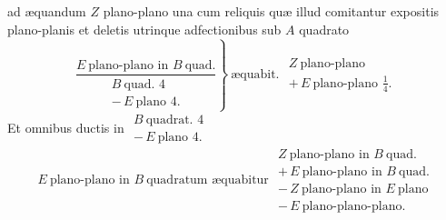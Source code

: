 \documentclass[11pt,a4paper]{article}
\begin{document}
ad æquandum $Z$ plano-plano una cum reliquis quæ illud comitantur  expositis plano-planis et deletis utrinque adfectionibus sub  $A$ quadrato
\[ \left.\dfrac{E\ \text{plano-plano in } B\ \text{quad.}}{\begin{array}{l} B\ \text{quad. } 4 \\ -\,E\ \text{plano } 4. \end{array}}\right\}\ \text{æquabit. } \begin{array}{l} Z\ \text{plano-plano} \\ +\,E\ \text{plano-plano } \frac{1}{4}. \end{array} \]
Et omnibus ductis in $\begin{array}{l} B\ \text{quadrat. } 4 \\ -\,E\ \text{plano } 4. \end{array}$
\[ E\ \text{plano-plano in } B\ \text{quadratum æquabitur } \begin{array}{l} Z\ \text{plano-plano in } B\ \text{quad.} \\ +\,E\ \text{plano-plano in } B\ \text{quad.} \\ -\,Z\ \text{plano-plano in } E\ \text{plano} \\ -\,E\ \text{plano-plano-plano.} \end{array} \]
\end{document}
